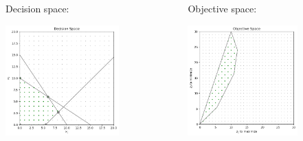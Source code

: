 \documentclass[]{beamer}
\begin{document}
\begin{frame}
    \begin{columns}
      \begin{column}{0.5\textwidth}
      Decision space:
      
      \begin{center}
      \includegraphics[height=4.25cm]{decisionSpace.png} 
       \end{center}
      \end{column}
      \begin{column}{0.5\textwidth}
      Objective space:
      
      \begin{center}
      \includegraphics[height=4.25cm]{objectiveSpace.png} 
       \end{center}
      \end{column}
      \end{columns} 

\end{frame}



% 
%
\end{document}
